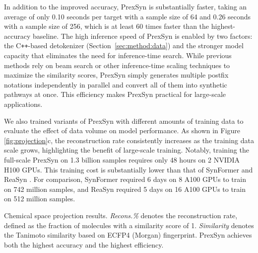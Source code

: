 In addition to the improved accuracy, PrexSyn is substantially faster, taking an average of only 0.10 seconds per target with a sample size of 64 and 0.26 seconds with a sample size of 256, which is at least 60 times faster than the highest-accuracy baseline.
The high inference speed of PrexSyn is enabled by two factors: the C\texttt{++}-based detokenizer (Section~\ref{sec:method:data}) and the stronger model capacity that eliminates the need for inference-time search.
While previous methods \citep{luo2024projecting,gao2025generative,lee2025rethinking} rely on beam search or other inference-time scaling techniques to maximize the similarity scores, PrexSyn simply generates multiple postfix notations independently in parallel and convert all of them into synthetic pathways at once.
This efficiency makes PrexSyn practical for large-scale applications.

We also trained variants of PrexSyn with different amounts of training data to evaluate the effect of data volume on model performance.
As shown in Figure \ref{fig:projection}c, the reconstruction rate consistently increases as the training data scale grows, highlighting the benefit of large-scale training.
Notably, training the full-scale PrexSyn on 1.3 billion samples requires only 48 hours on 2 NVIDIA H100 GPUs.
This training cost is substantially lower than that of SynFormer \citep{gao2025generative} and ReaSyn \citep{lee2025rethinking}.
For comparison, SynFormer required 6 days on 8 A100 GPUs to train on 742 million samples, and ReaSyn required 5 days on 16 A100 GPUs to train on 512 million samples. 


\begin{table}[tb]
  \small
  \caption{Chemical space projection results. \textit{Recons.\%} denotes the reconstruction rate, defined as the fraction of molecules with a similarity score of 1. \textit{Similarity} denotes the Tanimoto similarity based on ECFP4 (Morgan) fingerprint. PrexSyn achieves both the highest accuracy and the highest efficiency.}
  \label{tab:projection}
  \centering
  \begin{adjustbox}{max width=1\textwidth}
  
  \end{adjustbox}
\end{table}

